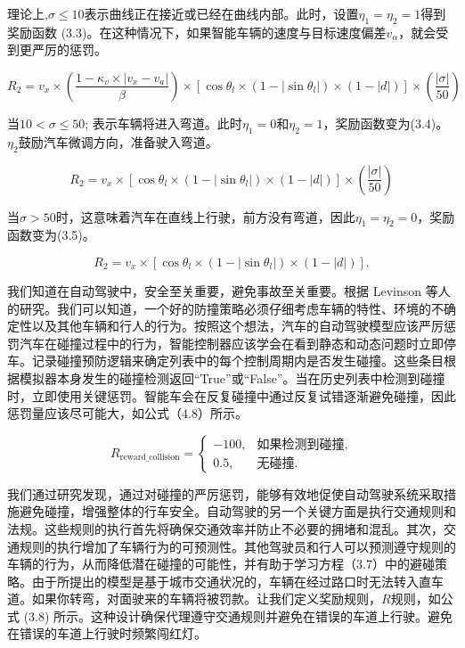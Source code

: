 理论上,$𝜎 ≤ 10$表示曲线正在接近或已经在曲线内部。此时，设置$𝜂_1 = 𝜂_2 = 1$得到奖励函数 (3.3)。在这种情况下，如果智能车辆的速度与目标速度偏差$𝑣_𝛼$，就会受到更严厉的惩罚。

\begin{equation}
	R_2 = v_x \times \left( \frac{1 - \kappa_v \times \lvert v_x - v_a \rvert}{\beta} \right) \times \left[ \cos \theta_l \times (1 - \lvert \sin \theta_l \rvert) \times (1 - \lvert d \rvert) \right] \times \left( \frac{\lvert \sigma \rvert}{50} \right)
\end{equation}

当$10 < 𝜎 ≤ 50$; 表示车辆将进入弯道。此时$𝜂_1 = 0$和$𝜂_2 = 1$，奖励函数变为(3.4)。
$𝜂_2$鼓励汽车微调方向，准备驶入弯道。

\begin{equation}
	R_2 = v_x \times \left[ \cos \theta_l \times (1 - |\sin \theta_l|) \times (1 - |d|) \right] \times \left( \frac{|\sigma|}{50} \right)
\end{equation}

当$𝜎>50$时，这意味着汽车在直线上行驶，前方没有弯道，因此$𝜂_1=𝜂_2=0$，奖励函数变为(3.5)。

\begin{equation}
	R_2 = v_x \times \left[ \cos \theta_l \times (1 - |\sin \theta_l|) \times (1 - |d|) \right].
\end{equation}

我们知道在自动驾驶中，安全至关重要，避免事故至关重要。根据 Levinson 等人的研究\cite{levinson2011towards}。我们可以知道，一个好的防撞策略必须仔细考虑车辆的特性、环境的不确定性以及其他车辆和行人的行为。按照这个想法，汽车的自动驾驶模型应该严厉惩罚汽车在碰撞过程中的行为，智能控制器应该学会在看到静态和动态问题时立即停车。记录碰撞预防逻辑来确定列表中的每个控制周期内是否发生碰撞。这些条目根据模拟器本身发生的碰撞检测返回“True”或“False”。当在历史列表中检测到碰撞时，立即使用关键惩罚。智能车会在反复碰撞中通过反复试错逐渐避免碰撞，因此惩罚量应该尽可能大，如公式（4.8）所示。

\begin{equation}
	R_{\text{reward\_collision}} = 
	\begin{cases} 
		-100, & \text{如果检测到碰撞}, \\ 
		0.5,  & \text{无碰撞}. 
	\end{cases}
\end{equation}

我们通过研究发现，通过对碰撞的严厉惩罚，能够有效地促使自动驾驶系统采取措施避免碰撞，增强整体的行车安全。自动驾驶的另一个关键方面是执行交通规则和法规。这些规则的执行首先将确保交通效率并防止不必要的拥堵和混乱。其次，交通规则的执行增加了车辆行为的可预测性。其他驾驶员和行人可以预测遵守规则的车辆的行为，从而降低潜在碰撞的可能性，并有助于学习方程（3.7）中的避碰策略。由于所提出的模型是基于城市交通状况的，车辆在经过路口时无法转入直车道。如果你转弯，对面驶来的车辆将被罚款。让我们定义奖励规则，$𝑅$规则，如公式 (3.8) 所示。这种设计确保代理遵守交通规则并避免在错误的车道上行驶。避免在错误的车道上行驶时频繁闯红灯。


